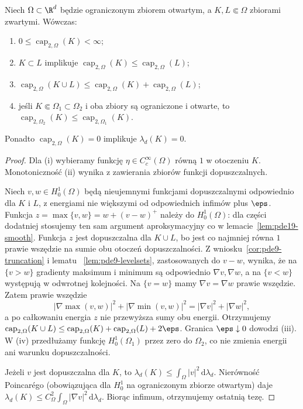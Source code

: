 \begin{twierdzenie}
\label{thm:pde19-basic}
Niech $\Omega\subset\R^d$ będzie ograniczonym zbiorem otwartym,
a $K,L\Subset\Omega$ zbiorami zwartymi. Wówczas:
\begin{enumerate}[label=\textup{(\roman*)}]
\item $0\le\operatorname{cap}_{2,\Omega}(K)<\infty$;
\item $K\subset L$ implikuje
$\operatorname{cap}_{2,\Omega}(K)\le\operatorname{cap}_{2,\Omega}(L)$;
\item $\operatorname{cap}_{2,\Omega}(K\cup L)\le
\operatorname{cap}_{2,\Omega}(K)+\operatorname{cap}_{2,\Omega}(L)$;
\item jeśli $K\Subset\Omega_1\subset\Omega_2$ i oba zbiory są
ograniczone i otwarte, to
$\operatorname{cap}_{2,\Omega_2}(K)\le
\operatorname{cap}_{2,\Omega_1}(K)$.
\end{enumerate}
Ponadto $\operatorname{cap}_{2,\Omega}(K)=0$ implikuje
$\lambda_d(K)=0$.
\end{twierdzenie}
\begin{proof}
Dla (i) wybieramy funkcję $\eta\in C_c^\infty(\Omega)$ równą
$1$ w otoczeniu $K$. Monotoniczność (ii) wynika z zawierania
zbiorów funkcji dopuszczalnych.

Niech $v,w\in H_0^1(\Omega)$ będą nieujemnymi funkcjami
dopuszczalnymi odpowiednio dla $K$ i $L$, z energiami nie większymi
od odpowiednich infimów plus $\eps$. Funkcja
$z=\max\{v,w\}=w+(v-w)^+$ należy do $H_0^1(\Omega)$:
dla części dodatniej stosujemy ten sam argument aproksymacyjny
co w lemacie~\ref{lem:pde19-smooth}. Funkcja $z$ jest
dopuszczalna dla $K\cup L$, bo jest co najmniej równa $1$
prawie wszędzie na sumie obu otoczeń dopuszczalności.
Z wniosku~\ref{cor:pde9-truncation} i lematu
~\ref{lem:pde9-levelsets}, zastosowanych do $v-w$,
wynika, że na $\{v>w\}$ gradienty maksimum i minimum
są odpowiednio $\nabla v,\nabla w$, a na $\{v<w\}$
występują w odwrotnej kolejności. Na $\{v=w\}$
mamy $\nabla v=\nabla w$ prawie wszędzie.
Zatem prawie wszędzie
\[
 |\nabla\max(v,w)|^2+|\nabla\min(v,w)|^2
 =|\nabla v|^2+|\nabla w|^2,
\]
a po całkowaniu energia $z$ nie przewyższa sumy
obu energii. Otrzymujemy
$\operatorname{cap}_{2,\Omega}(K\cup L)
\le\operatorname{cap}_{2,\Omega}(K)+
\operatorname{cap}_{2,\Omega}(L)+2\eps$.
Granica $\eps\downarrow0$ dowodzi (iii). W (iv) przedłużamy funkcję
$H_0^1(\Omega_1)$ przez zero do $\Omega_2$, co nie zmienia
energii ani warunku dopuszczalności.

Jeżeli $v$ jest dopuszczalna dla $K$, to
$\lambda_d(K)\le\int_\Omega|v|^2\,\mathrm d\lambda_d$.
Nierówność Poincarégo (obowiązująca dla $H_0^1$ na
ograniczonym zbiorze otwartym) daje
$\lambda_d(K)\le C_\Omega^2\int_\Omega|\nabla v|^2\,\mathrm d\lambda_d$.
Biorąc infimum, otrzymujemy ostatnią tezę.
\end{proof}

